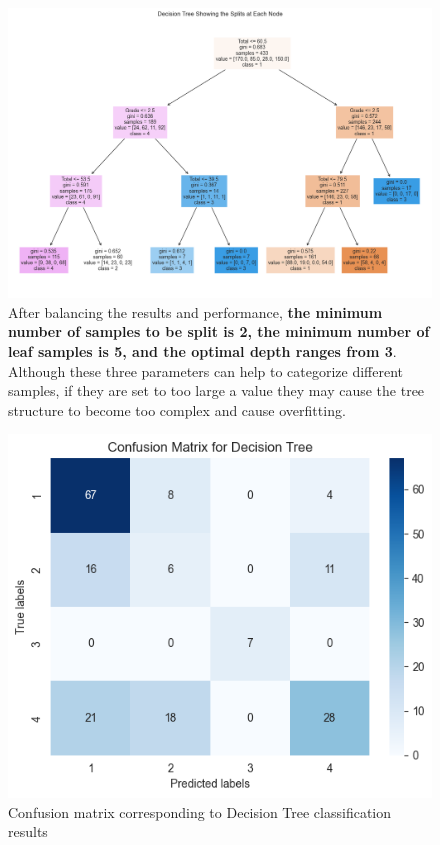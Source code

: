 \documentclass[twocolumn]{IEEEtran}
\begin{document}
\begin{figure}[H]
    \centering %
    \includegraphics[scale=0.25]{./img/decision_tree.png}
    \caption{After balancing the results and performance, \textbf{the minimum number of samples to be split is 2, the minimum number of leaf samples is 5, and the optimal depth ranges from 3}. Although these three parameters can help to categorize different samples, if they are set to too large a value they may cause the tree structure to become too complex and cause overfitting.}
\end{figure}

\begin{figure}[H]
    \centering %
    \includegraphics[scale=0.36]{./img/dt_matrix.png}
    \caption{Confusion matrix corresponding to Decision Tree classification results}
\end{figure}
\end{document}
